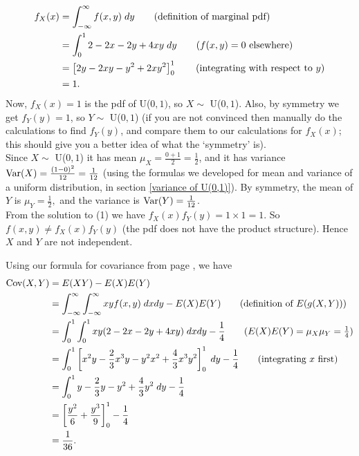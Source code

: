 \solution[to (1)]
\begin{align*}
f_X(x) & = \int_{-\infty}^\infty f(x,y) \; dy \tag{definition of marginal pdf} \\
	  & = \int_0^1 2 - 2x - 2y + 4xy \; dy \tag{$f(x,y) = 0$ elsewhere} \\
	  & = \left[2y - 2xy - y^2 + 2xy^2\right]_0^1 \tag{integrating with respect to $y$} \\
	  & = 1.
\end{align*}
Now, $f_X(x) = 1$ is the pdf of U($0,1)$, so $X \sim$ U($0,1$). Also, by symmetry we get $f_Y(y) = 1$, so $Y \sim$ U($0,1$) (if you are not convinced then manually do the calculations to find $f_Y(y)$, and compare them to our calculations for $f_X(x)$; this should give you a better idea of what the `symmetry' is). \\

\solution[to (2) and (3)]
Since $X \sim$ U($0,1$) it has mean $\mu_X = \frac{0+1}{2} = \frac{1}{2}$, and it has variance $\text{Var}(X) = \frac{(1-0)^2}{12} = \frac{1}{12}$ (using the formulas we developed for mean and variance of a uniform distribution, in section \ref{variance of U(0,1)}). By symmetry, the mean of $Y$ is $\mu_Y = \frac{1}{2},$ and the variance is $\text{Var}(Y) = \frac{1}{12}$. \\

\solution[to (4)]
From the solution to (1) we have $f_X(x)f_Y(y) = 1\times 1 = 1$. So  $f(x,y) \neq f_X(x)f_Y(y)$ (the pdf does not have the product structure). Hence $X$ and $Y$ are not independent.

\solution[to (5)]
Using our formula for covariance from page \pageref{covariance formula 2}, we have
\begin{align*}
\Cov(X,Y) & = E(XY) - E(X)E(Y) \\
	& = \int_{-\infty}^\infty \int_{-\infty}^\infty xyf(x,y) \; dxdy - E(X)E(Y) \tag{definition of $E(g(X,Y))$} \\
	& = \int_{0}^1 \int_{0}^1 xy(2-2x-2y+4xy) \; dxdy - \frac{1}{4} \tag{$E(X)E(Y) = \mu_X\mu_Y = \frac{1}{4}$} \\
	& = \int_{0}^1 \squac{x^2y - \frac{2}{3}x^3y - y^2x^2 + \frac{4}{3}x^3y^2}_0^1 \; dy - \frac{1}{4} \tag{integrating $x$ first} \\
	& =  \int_{0}^1 y - \frac{2}{3}y - y^2 + \frac{4}{3}y^2 \; dy - \frac{1}{4} \\
	& = \squac{\frac{y^2}{6} + \frac{y^3}{9}}_0^1 - \frac{1}{4} \\
	& = \frac{1}{36}.
\end{align*}

